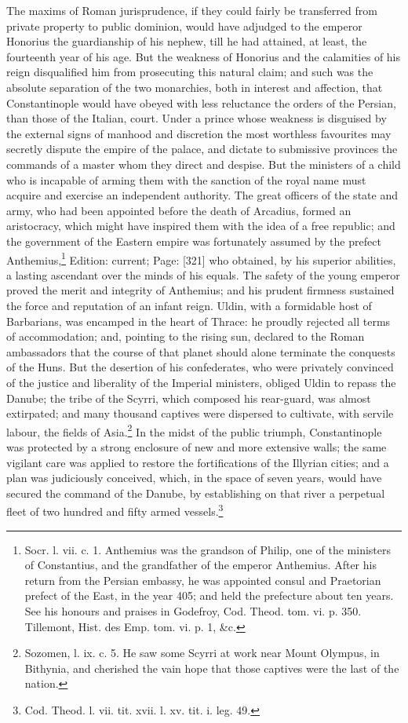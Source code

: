 The maxims of Roman jurisprudence, if they could fairly be transferred from private property to public dominion, would have adjudged to the emperor Honorius the guardianship of his nephew, till he had attained, at least, the fourteenth year of his age. But the weakness of Honorius and the calamities of his reign disqualified him from prosecuting this natural claim; and such was the absolute separation of the two monarchies, both in interest and affection, that Constantinople would have obeyed with less reluctance the orders of the Persian, than those of the Italian, court. Under a prince whose weakness is disguised by the external signs of manhood and discretion the most worthless favourites may secretly dispute the empire of the palace, and dictate to submissive provinces the commands of a master whom they direct and despise. But the ministers of a child who is incapable of arming them with the sanction of the royal name must acquire and exercise an independent authority. The great officers of the state and army, who had been appointed before the death of Arcadius, formed an aristocracy, which might have inspired them with the idea of a free republic; and the government of the Eastern empire was fortunately assumed by the prefect Anthemius,\footnote{Socr. l. vii. c. 1. Anthemius was the grandson of Philip, one of the ministers of Constantius, and the grandfather of the emperor Anthemius. After his return from the Persian embassy, he was appointed consul and Praetorian prefect of the East, in the year 405; and held the prefecture about ten years. See his honours and praises in Godefroy, Cod. Theod. tom. vi. p. 350. Tillemont, Hist. des Emp. tom. vi. p. 1, \&c.} Edition: current; Page: [321] who obtained, by his superior abilities, a lasting ascendant over the minds of his equals. The safety of the young emperor proved the merit and integrity of Anthemius; and his prudent firmness sustained the force and reputation of an infant reign. Uldin, with a formidable host of Barbarians, was encamped in the heart of Thrace: he proudly rejected all terms of accommodation; and, pointing to the rising sun, declared to the Roman ambassadors that the course of that planet should alone terminate the conquests of the Huns. But the desertion of his confederates, who were privately convinced of the justice and liberality of the Imperial ministers, obliged Uldin to repass the Danube; the tribe of the Scyrri, which composed his rear-guard, was almost extirpated; and many thousand captives were dispersed to cultivate, with servile labour, the fields of Asia.\footnote{Sozomen, l. ix. c. 5. He saw some Scyrri at work near Mount Olympus, in Bithynia, and cherished the vain hope that those captives were the last of the nation.} In the midst of the public triumph, Constantinople was protected by a strong enclosure of new and more extensive walls; the same vigilant care was applied to restore the fortifications of the Illyrian cities; and a plan was judiciously conceived, which, in the space of seven years, would have secured the command of the Danube, by establishing on that river a perpetual fleet of two hundred and fifty armed vessels.\footnote{Cod. Theod. l. vii. tit. xvii. l. xv. tit. i. leg. 49.}

